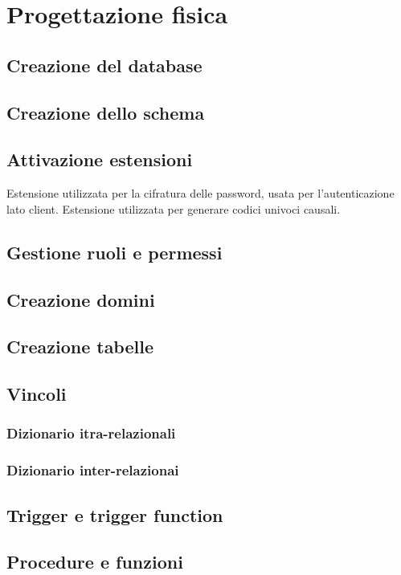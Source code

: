 \section{Progettazione fisica}
\subsection{Creazione del database}

\subsection{Creazione dello schema}

\subsection{Attivazione estensioni}
Estensione utilizzata per la cifratura delle password, usata per l'autenticazione lato client.
\medskip
Estensione utilizzata per generare codici univoci causali.


\subsection{Gestione ruoli e permessi}

\subsection{Creazione domini}








\subsection{Creazione tabelle}

\subsection{Vincoli}
\subsubsection{Dizionario itra-relazionali}
\subsubsection{Dizionario inter-relazionai}

\subsection{Trigger e trigger function}

\subsection{Procedure e funzioni}
